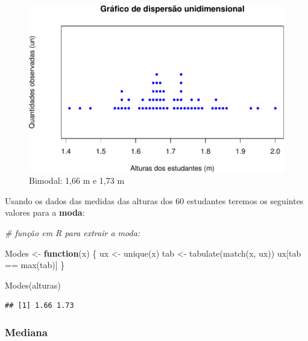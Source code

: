 \documentclass[
]{book}
\newenvironment{Shaded}{\begin{snugshade}}{\end{snugshade}}
\newcommand{\CommentTok}[1]{\textcolor[rgb]{0.56,0.35,0.01}{\textit{#1}}}
\newcommand{\ControlFlowTok}[1]{\textcolor[rgb]{0.13,0.29,0.53}{\textbf{#1}}}
\newcommand{\FunctionTok}[1]{\textcolor[rgb]{0.00,0.00,0.00}{#1}}
\newcommand{\NormalTok}[1]{#1}
\newcommand{\OtherTok}[1]{\textcolor[rgb]{0.56,0.35,0.01}{#1}}
\newcommand{\SpecialCharTok}[1]{\textcolor[rgb]{0.00,0.00,0.00}{#1}}
\begin{document}
\begin{figure}
\centering
\includegraphics{apostila_files/figure-latex/unnamed-chunk-22-1.pdf}
\caption{\label{fig:unnamed-chunk-22}Bimodal: 1,66 m e 1,73 m}
\end{figure}

\hfill\break

Usando os dados das medidas das alturas dos 60 estudantes teremos os seguintes valores para a \textbf{moda}:

\hfill\break

\begin{Shaded}
\begin{Highlighting}[]
\CommentTok{\# função em R para extrair a moda:}

\NormalTok{Modes }\OtherTok{\textless{}{-}} \ControlFlowTok{function}\NormalTok{(x) \{}
\NormalTok{  ux }\OtherTok{\textless{}{-}} \FunctionTok{unique}\NormalTok{(x)}
\NormalTok{  tab }\OtherTok{\textless{}{-}} \FunctionTok{tabulate}\NormalTok{(}\FunctionTok{match}\NormalTok{(x, ux))}
\NormalTok{  ux[tab }\SpecialCharTok{==} \FunctionTok{max}\NormalTok{(tab)]}
\NormalTok{\}}

\FunctionTok{Modes}\NormalTok{(alturas)}
\end{Highlighting}
\end{Shaded}

\begin{verbatim}
## [1] 1.66 1.73
\end{verbatim}

\hypertarget{mediana}{%
\subsubsection{Mediana}\label{mediana}}
\end{document}

